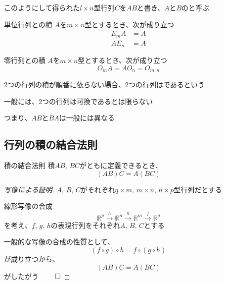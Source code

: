\documentclass[../../../topic_linear-algebra]{subfiles}
\begin{document}
\br

このようにして得られた$l \times n$型行列$C$を$AB$と書き、$A$と$B$のと呼ぶ

\sectionline

\begin{theorem*}{単位行列との積}
  $A$を$m \times n$型とするとき、次が成り立つ
  \begin{align*}
    E_mA & = A \\
    AE_n & = A
  \end{align*}
\end{theorem*}

\begin{theorem*}{零行列との積}
  $A$を$m \times n$型とするとき、次が成り立つ
  \begin{equation*}
    O_m A = A O_n = O_{m,n}
  \end{equation*}
\end{theorem*}

\sectionline

2つの行列の積が順番に依らない場合、2つの行列はであるという

\br

一般には、2つの行列は可換であるとは限らない

つまり、$AB$と$BA$は一般には異なる

\br


\subsection{行列の積の結合法則}

\begin{theorem*}{積の結合法則}
  積$AB, \, BC$がともに定義できるとき、
  \begin{equation*}
    (AB)C = A(BC)
  \end{equation*}
\end{theorem*}

\begin{proof}[写像による証明]
  $A,\,B, \, C$がそれぞれ$q \times m, \, m \times n, \, n \times p$型行列だとする

  線形写像の合成
  \begin{equation*}
    \mathbb{R}^p \xrightarrow{h} \mathbb{R}^n \xrightarrow{g} \mathbb{R}^m \xrightarrow{f} \mathbb{R}^q
  \end{equation*}
  を考え、$f,\, g, \, h$の表現行列をそれぞれ$A, \, B, \, C$とする

  一般的な写像の合成の性質として、
  \begin{equation*}
    (f \circ g) \circ h = f \circ (g \circ h)
  \end{equation*}
  が成り立つから、
  \begin{equation*}
    (AB)C = A(BC)
  \end{equation*}
  がしたがう $\qed$
\end{proof}
\end{document}
